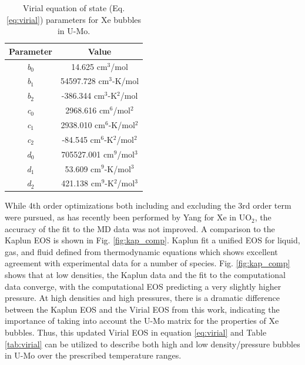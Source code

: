 \documentclass[review]{elsarticle}
\begin{document}
\begin{table}[h!]
\caption{Virial equation of state (Eq. \ref{eq:virial}) parameters for Xe bubbles in U-Mo.}
\label{tab:virial}
\begin{center}
\begin{tabular}{|c|c|}
     \hline
      Parameter & Value \\
     \hline
     \textit{b$_0$} & 14.625 cm$^3$/mol \\
     \textit{b$_1$} & 54597.728 cm$^3$-K/mol  \\
     \textit{b$_2$} & -386.344 cm$^3$-K$^2$/mol \\
     \textit{c$_0$} & 2968.616 cm$^6$/mol$^2$ \\
     \textit{c$_1$} & 2938.010 cm$^6$-K/mol$^2$  \\
     \textit{c$_2$} & -84.545 cm$^6$-K$^2$/mol$^2$ \\
     \textit{d$_0$} & 705527.001 cm$^9$/mol$^3$ \\
     \textit{d$_1$} & 53.609 cm$^9$-K/mol$^3$ \\
     \textit{d$_2$} & 421.138 cm$^9$-K$^2$/mol$^3$ \\
     \hline
\end{tabular}
\end{center}
\label{default}
\end{table}%

While 4th order optimizations both including and excluding the 3rd order term were pursued, as has recently been performed by Yang \cite{yang2022} for Xe in UO$_2$, the accuracy of the fit to the MD data was not improved. A comparison to the Kaplun EOS \cite{Kaplun2003} is shown in Fig. \ref{fig:kap_comp}. Kaplun fit a unified EOS for liquid, gas, and fluid defined from thermodynamic equations which shows excellent agreement with experimental data for a number of species. Fig. \ref{fig:kap_comp} shows that at low densities, the Kaplun data and the fit to the computational data converge, with the computational EOS predicting a very slightly higher pressure. At high densities and high pressures, there is a dramatic difference between the Kaplun EOS and the Virial EOS from this work, indicating the importance of taking into account the U-Mo matrix for the properties of Xe bubbles. Thus, this updated Virial EOS in equation \ref{eq:virial} and Table \ref{tab:virial} can be utilized to describe both high and low density/pressure bubbles in U-Mo over the prescribed temperature ranges. 
\end{document}
